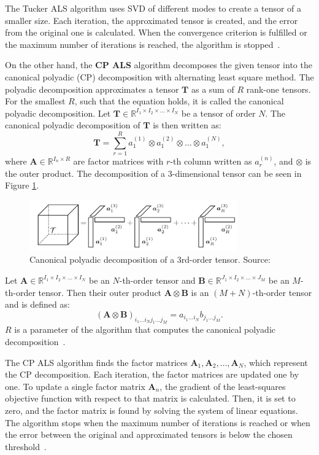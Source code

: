 \documentclass[thesis=M,english]{FITthesis}[2019/12/23]
\begin{document}
The Tucker ALS algorithm uses SVD of different modes to create a tensor of a smaller size. Each iteration, the approximated tensor is created, and the error from the original one is calculated. When the convergence criterion is fulfilled or the maximum number of iterations is reached, the algorithm is stopped~\cite{tucker_decomp}.

On the other hand, the \textbf{CP ALS} algorithm decomposes the given tensor into the canonical polyadic (CP) decomposition with alternating least square method. The polyadic decomposition approximates a tensor $\boldsymbol{T}$ as a sum of $R$ rank-one tensors. For the smallest $R$, such that the equation holds, it is called the canonical polyadic decomposition. Let $\boldsymbol{T} \in \mathbb{R}^{I_1 \times I_2 \times \dots \times I_N}$ be a tensor of order $N$. The canonical polyadic decomposition of $\boldsymbol{T}$ is then written as: $$\boldsymbol{T} = \sum_{r = 1}^R a_1^{(1)} \otimes a_1^{(2)} \otimes \dots \otimes a_1^{(N)},$$ where $\boldsymbol{A} \in \mathbb{R}^{I_n \times R}$ are factor matrices with $r$-th column written as $a_r^{(n)}$, and $\otimes$ is the outer product. The decomposition of a 3-dimensional tensor can be seen in Figure \ref{fig:cp_decomp}.
\begin{figure}[h]
    \centering
    \includegraphics[width=0.8\textwidth]{figures/cp_decomp.png}
    \caption{Canonical polyadic decomposition of a 3rd-order tensor. Source: \cite{cp_decomp_pic}}
    \label{fig:cp_decomp}
\end{figure}
Let $\boldsymbol{A} \in \mathbb{R}^{I_1 \times I_2 \times \dots \times I_N}$ be an $N$-th-order tensor and $\boldsymbol{B} \in \mathbb{R}^{J_1 \times I_2 \times \dots \times J_M}$ be an $M$-th-order tensor. Then their outer product $\boldsymbol{A} \otimes \boldsymbol{B}$ is an $(M + N)$-th-order tensor and is defined as: $$(\boldsymbol{A} \otimes \boldsymbol{B})_{i_1 \dots i_N j_1 \dots j_M} = a_{i_1 \dots i_N} b_{j_1 \dots j_M}.$$ $R$ is a parameter of the algorithm that computes the canonical polyadic decomposition~\cite{cp_decomp}.

The CP ALS algorithm finds the factor matrices $\boldsymbol{A}_1, \boldsymbol{A}_2, \dots, \boldsymbol{A}_N$, which represent the CP decomposition. Each iteration, the factor matrices are updated one by one. To update a single factor matrix $\boldsymbol{A}_n$, the gradient of the least-squares objective function with respect to that matrix is calculated. Then, it is set to zero, and the factor matrix is found by solving the system of linear equations. The algorithm stops when the maximum number of iterations is reached or when the error between the original and approximated tensors is below the chosen threshold~\cite{cp_als}.
\end{document}
